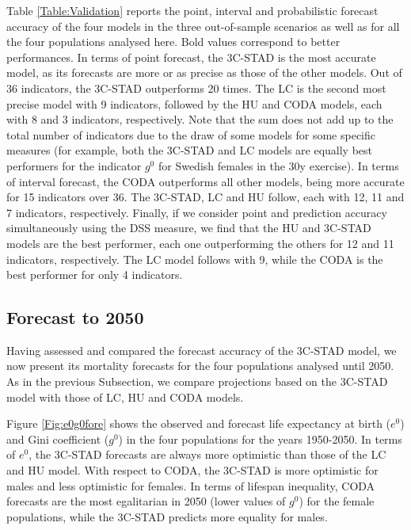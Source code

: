 \documentclass[11pt, a4paper]{article}
\begin{document}
Table \ref{Table:Validation} reports the point, interval and probabilistic forecast accuracy of the four models in the three out-of-sample scenarios as well as for all the four populations analysed here. Bold values correspond to better performances. In terms of point forecast, the 3C-STAD is the most accurate model, as its forecasts are more or as precise as those of the other models. Out of 36 indicators, the 3C-STAD outperforms 20 times. The LC is the second most precise model with 9 indicators, followed by the HU and CODA models, each with 8 and 3 indicators, respectively. Note that the sum does not add up to the total number of indicators due to the draw of some models for some specific measures (for example, both the 3C-STAD and LC models are equally best performers for the indicator $g^0$ for Swedish females in the 30y exercise). In terms of interval forecast, the CODA outperforms all other models, being more accurate for 15 indicators over 36. The 3C-STAD, LC and HU follow, each with 12, 11 and 7 indicators, respectively. Finally, if we consider point and prediction accuracy simultaneously using the DSS measure, we find that the HU and 3C-STAD models are the best performer, each one outperforming the others for 12 and 11 indicators, respectively. The LC model follows with 9, while the CODA is the best performer for only 4 indicators. 


\subsection{Forecast to 2050}\label{Subsec:Forecast2050}

Having assessed and compared the forecast accuracy of the 3C-STAD model, we now present its mortality forecasts for the four populations analysed until 2050. As in the previous Subsection, we compare projections based on the 3C-STAD model with those of LC, HU and CODA models.

Figure \ref{Fig:e0g0fore} shows the observed and forecast life expectancy at birth ($e^{0}$) and Gini coefficient ($g^{0}$) in the four populations for the years 1950-2050. In terms of $e^{0}$, the 3C-STAD forecasts are always more optimistic than those of the LC and HU model. With respect to CODA, the 3C-STAD is more optimistic for males and less optimistic for females. In terms of lifespan inequality, CODA forecasts are the most egalitarian in 2050 (lower values of $g^{0}$) for the female populations, while the 3C-STAD predicts more equality for males.
\end{document}
